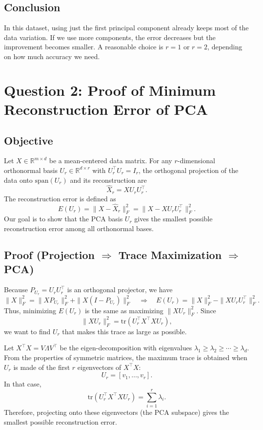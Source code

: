 \documentclass[12pt,a4paper]{article}
\begin{document}
\subsection{Conclusion}
In this dataset, using just the first principal component already keeps most of the data variation. 
If we use more components, the error decreases but the improvement becomes smaller. 
A reasonable choice is $r=1$ or $r=2$, depending on how much accuracy we need.

\newpage
\section{Question 2: Proof of Minimum Reconstruction Error of PCA}

\subsection{Objective}
Let $X \in \mathbb{R}^{m\times d}$ be a mean-centered data matrix.
For any $r$-dimensional orthonormal basis $U_r \in \mathbb{R}^{d\times r}$ with $U_r^\top U_r = I_r$, 
the orthogonal projection of the data onto $\text{span}(U_r)$ and its reconstruction are
\[
\hat X_r = XU_rU_r^\top.
\]
The reconstruction error is defined as
\[
E(U_r) = \|X - \hat X_r\|_F^2 = \|X - XU_rU_r^\top\|_F^2.
\]
Our goal is to show that the PCA basis $U_r$ gives the smallest possible reconstruction error among all orthonormal bases.

\subsection{Proof (Projection $\Rightarrow$ Trace Maximization $\Rightarrow$ PCA)}
Because $P_{U_r}=U_rU_r^\top$ is an orthogonal projector, we have
\[
\|X\|_F^2 = \|XP_{U_r}\|_F^2 + \|X(I-P_{U_r})\|_F^2
\quad\Rightarrow\quad
E(U_r) = \|X\|_F^2 - \|XU_rU_r^\top\|_F^2.
\]
Thus, minimizing $E(U_r)$ is the same as maximizing $\|XU_r\|_F^2$.
Since
\[
\|XU_r\|_F^2 = \text{tr}(U_r^\top X^\top XU_r),
\]
we want to find $U_r$ that makes this trace as large as possible.

Let $X^\top X = V\Lambda V^\top$ be the eigen-decomposition with eigenvalues
$\lambda_1 \ge \lambda_2 \ge \cdots \ge \lambda_d$.
From the properties of symmetric matrices, the maximum trace is obtained when
$U_r$ is made of the first $r$ eigenvectors of $X^\top X$:
\[
U_r = [v_1,\ldots,v_r].
\]
In that case,
\[
\text{tr}(U_r^\top X^\top XU_r) = \sum_{i=1}^{r}\lambda_i.
\]
Therefore, projecting onto these eigenvectors (the PCA subspace) gives the smallest possible reconstruction error.
\end{document}
